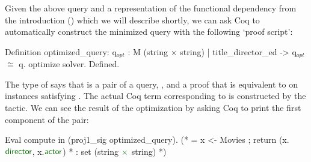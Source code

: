 \documentclass[preprint]{sigplanconf}
\begin{document}
Given the above query and a representation of the functional dependency from the introduction () which we will describe shortly, we can ask Coq to automatically construct the minimized query with the following `proof script':
\begin{coq}
Definition optimized_query:
{q$_{opt}$ : M (string $\times$ string) | title_director_ed -> q$_{opt}$ $\cong$ q}.
optimize solver.
Defined.
\end{coq}
The type of  says that  is a pair of a query, , and a proof that  is equivalent to  on instances satisfying .
The actual Coq term corresponding to  is constructed by the  tactic.  We can see the result of the optimization by asking Coq to print the first component of the pair:
\begin{coq}
Eval compute in (proj1_sig optimized_query).
(* = x <- Movies ; return (x.$\textcolor{dkgreen}{\textsf{director}}$, x.$\textcolor{dkgreen}{\textsf{actor}}$)
 *   : set (string $\textcolor{dkgreen}{\times}$ string)   *)
\end{coq}


 
\end{document}
